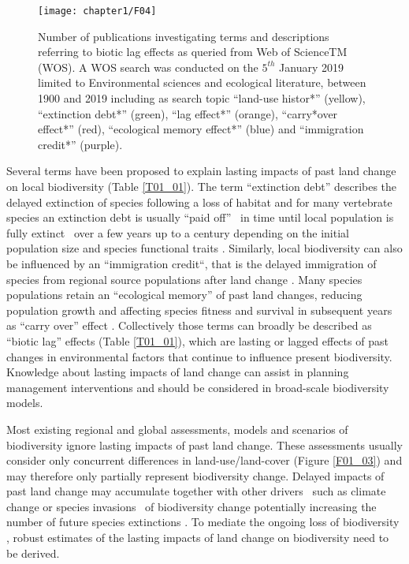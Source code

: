 \begin{figure}[htb]
\centering
\texttt{[image: chapter1/F04]}
\caption{ Number of publications investigating terms and descriptions referring to biotic lag effects as queried from Web of ScienceTM (WOS). A WOS search was conducted on the $5^{th}$ January 2019 limited to Environmental sciences and ecological literature, between 1900 and 2019 including as search topic    “land-use histor*” (yellow), “extinction debt*” (green), “lag effect*” (orange), “carry*over effect*” (red), “ecological memory effect*” (blue) and “immigration credit*” (purple).  }
\label{F01_04}
\end{figure}

Several terms have been proposed to explain lasting impacts of past land change on local biodiversity (Table \ref{T01_01}). The term “extinction debt” describes the delayed extinction of species following a loss of habitat \citep{Balmford1996,Kuussaari2009,Wearn2012} and for many vertebrate species an extinction debt is usually “paid off” \textendash\ \eg in time until local population is fully extinct \textendash\ over a few years up to a century depending on the initial population size and species functional traits \citep{Halley2016}. Similarly, local biodiversity can also be influenced by an “immigration credit“, that is the delayed immigration of species from regional source populations after land change \citep{Jackson2010,Hylander2013}. Many species populations retain an “ecological memory” \citep{Peterson2002,Bengtsson2003,Ogle2015} of past land changes, reducing population growth and affecting species fitness and survival in subsequent years as “carry over” effect \citep{Harrison2011}. Collectively those terms can broadly be described as “biotic lag” effects (Table \ref{T01_01}), which are lasting or lagged effects of past changes in environmental factors that continue to influence present biodiversity. Knowledge about lasting impacts of land change can assist in planning management interventions \citep{Standish2014} and should be considered in broad-scale biodiversity models.  

Most existing regional and global assessments, models and scenarios of biodiversity \citep[\eg \ those included in the Intergovernmental Science-Policy Platform on Biodiversity and Ecosystem Services (IPBES) assessments, ][]{Alkemade2009,Pereira2010,Newbold2015} ignore lasting impacts of past land change. These assessments usually consider only concurrent differences in land-use/land-cover (Figure \ref{F01_03}) and may therefore only partially represent biodiversity change. Delayed impacts of past land change may accumulate together with other drivers \textendash\ such as climate change or species invasions \textendash\ of biodiversity change \citep{Essl2015,Essl2015a} potentially increasing the number of future species extinctions \citep{Dullinger2013}. To mediate the ongoing loss of biodiversity \citep{Mace2018}, robust estimates of the lasting impacts of land change on biodiversity need to be derived.

